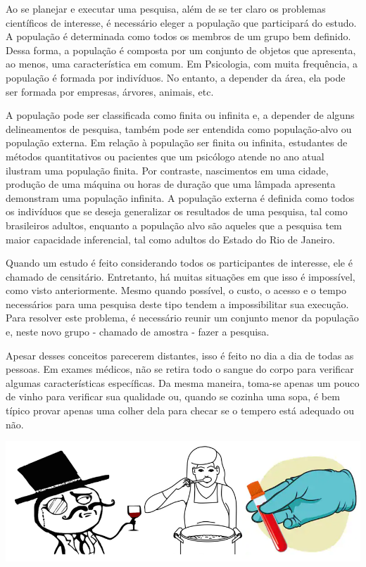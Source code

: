 \documentclass[
]{book}
\begin{document}
Ao se planejar e executar uma pesquisa, além de se ter claro os problemas científicos de interesse, é necessário eleger a população que participará do estudo. A população é determinada como todos os membros de um grupo bem definido. Dessa forma, a população é composta por um conjunto de objetos que apresenta, ao menos, uma característica em comum. Em Psicologia, com muita frequência, a população é formada por indivíduos. No entanto, a depender da área, ela pode ser formada por empresas, árvores, animais, etc.

A população pode ser classificada como finita ou infinita e, a depender de alguns delineamentos de pesquisa, também pode ser entendida como população-alvo ou população externa. Em relação à população ser finita ou infinita, estudantes de métodos quantitativos ou pacientes que um psicólogo atende no ano atual ilustram uma população finita. Por contraste, nascimentos em uma cidade, produção de uma máquina ou horas de duração que uma lâmpada apresenta demonstram uma população infinita. A população externa é definida como todos os indivíduos que se deseja generalizar os resultados de uma pesquisa, tal como brasileiros adultos, enquanto a população alvo são aqueles que a pesquisa tem maior capacidade inferencial, tal como adultos do Estado do Rio de Janeiro.

Quando um estudo é feito considerando todos os participantes de interesse, ele é chamado de censitário. Entretanto, há muitas situações em que isso é impossível, como visto anteriormente. Mesmo quando possível, o custo, o acesso e o tempo necessários para uma pesquisa deste tipo tendem a impossibilitar sua execução. Para resolver este problema, é necessário reunir um conjunto menor da população e, neste novo grupo - chamado de amostra - fazer a pesquisa.

Apesar desses conceitos parecerem distantes, isso é feito no dia a dia de todas as pessoas. Em exames médicos, não se retira todo o sangue do corpo para verificar algumas características específicas. Da mesma maneira, toma-se apenas um pouco de vinho para verificar sua qualidade ou, quando se cozinha uma sopa, é bem típico provar apenas uma colher dela para checar se o tempero está adequado ou não.

\includegraphics{./img/cap_amostra_desenhos.png}
\end{document}
